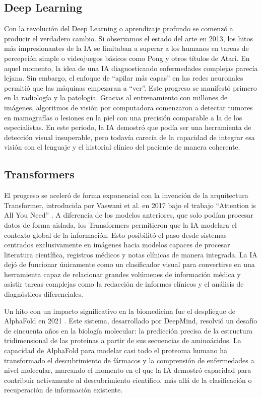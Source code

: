 \documentclass[10pt,a4paper]{article}
\begin{document}
\subsection{Deep Learning}
Con la revolución del Deep Learning o aprendizaje profundo se comenzó a producir el verdadero cambio. Si observamos el estado del arte en 2013, los hitos más impresionantes de la IA se limitaban a superar a los humanos en tareas de percepción simple o videojuegos básicos como Pong y otros títulos de Atari. En aquel momento, la idea de una IA diagnosticando enfermedades complejas parecía lejana. Sin embargo, el enfoque de ``apilar más capas'' en las redes neuronales permitió que las máquinas empezaran a ``ver''. Este progreso se manifestó primero en la radiología y la patología. Gracias al entrenamiento con millones de imágenes, algoritmos de visión por computadora comenzaron a detectar tumores en mamografías o lesiones en la piel con una precisión comparable a la de los especialistas. En este periodo, la IA demostró que podía ser una herramienta de detección visual insuperable, pero todavía carecía de la capacidad de integrar esa visión con el lenguaje y el historial clínico del paciente de manera coherente.

\subsection{Transformers}
El progreso se aceleró de forma exponencial con la invención de la arquitectura Transformer, introducida por Vaswani et al. en 2017 bajo el trabajo ``Attention is All You Need'' \cite{transformers}. A diferencia de los modelos anteriores, que solo podían procesar datos de forma aislada, los Transformers permitieron que la IA modelara el contexto global de la información. Esto posibilitó el paso desde sistemas centrados exclusivamente en imágenes hacia modelos capaces de procesar literatura científica, registros médicos y notas clínicas de manera integrada. La IA dejó de funcionar únicamente como un clasificador visual para convertirse en una herramienta capaz de relacionar grandes volúmenes de información médica y asistir tareas complejas como la redacción de informes clínicos y el análisis de diagnósticos diferenciales.

Un hito con un impacto significativo en la biomedicina fue el despliegue de AlphaFold en 2021 \cite{nature-alphafold}. Este sistema, desarrollado por DeepMind, resolvió un desafío de cincuenta años en la biología molecular: la predicción precisa de la estructura tridimensional de las proteínas a partir de sus secuencias de aminoácidos. La capacidad de AlphaFold para modelar casi todo el proteoma humano ha transformado el descubrimiento de fármacos y la comprensión de enfermedades a nivel molecular, marcando el momento en el que la IA demostró capacidad para contribuir activamente al descubrimiento científico, más allá de la clasificación o recuperación de información existente.
\end{document}
